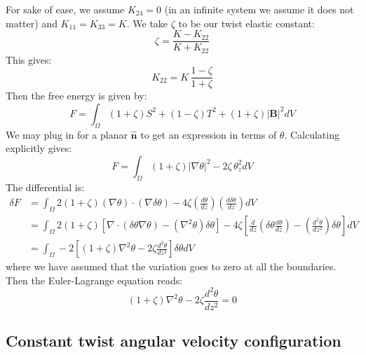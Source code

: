 \documentclass[reqno]{article}
\newcommand{\n}{\hat{\mathbf{n}}}
\begin{document}
For sake of ease, we assume $K_{24} = 0$ (in an infinite system we assume it does not matter) and $K_{11} = K_{33} = K$.
We take $\zeta$ to be our twist elastic constant:
\begin{equation}
    \zeta
    =
    \frac{K - K_{22}}{K + K_{22}}
\end{equation}
This gives:
\begin{equation}
    K_{22}
    =
    K \, \frac{1 - \zeta}{1 + \zeta}
\end{equation}
Then the free energy is given by:
\begin{equation}
    F
    =
    \int_\Omega
    (1 + \zeta) S^2
    + (1 - \zeta) T^2
    + (1 + \zeta) \left| \mathbf{B} \right|^2
    dV
\end{equation}
We may plug in for a planar $\n$ to get an expression in terms of $\theta$.
Calculating explicitly gives:
\begin{equation}
    F
    =
    \int_\Omega
    (1 + \zeta) \left|\nabla \theta\right|^2
    - 2 \zeta \, \theta_z^2
    dV
\end{equation}
The differential is:
\begin{equation}
\begin{split}
    \delta F
    &=
    \int_\Omega
    2 (1 + \zeta) \left(\nabla \theta\right) \cdot \left( \nabla \delta \theta \right)
    - 4 \zeta \left( \frac{d \theta}{dz} \right) \left(\frac{d \delta \theta}{d z} \right)
    dV \\
    &=
    \int_\Omega
    2 (1 + \zeta) \left[
        \nabla \cdot \left(\delta \theta \nabla \theta\right)  
        - \left(\nabla^2 \theta\right) \delta \theta
    \right]
    - 4 \zeta \left[
        \frac{d}{dz} \left( \delta \theta \frac{d \theta}{dz} \right) 
        - \left( \frac{d^2 \theta}{dz^2} \right) \delta \theta
    \right]
    dV \\
    &=
    \int_\Omega
    - 2 \left[
        (1 + \zeta) \nabla^2 \theta 
        - 2 \zeta \frac{d^2 \theta}{dz^2}
    \right] \delta \theta
    dV
\end{split}
\end{equation}
where we have assumed that the variation goes to zero at all the boundaries.
Then the Euler-Lagrange equation reads:
\begin{equation}
    (1 + \zeta) \nabla^2 \theta 
    - 2 \zeta \frac{d^2 \theta}{dz^2}
    = 
    0
\end{equation}

\subsection{Constant twist angular velocity configuration}
\end{document}
